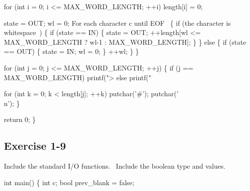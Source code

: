     for (int i = 0; i <= MAX_WORD_LENGTH; ++i)
        length[i] = 0;

    state = OUT;
    wl = 0;
    \LA{}For each character \code{}c\edoc{} until \code{}EOF\edoc{}~{\nwtagstyle{}}\RA{} \{
        if (\LA{}the character is whitespace~{\nwtagstyle{}}\RA{}) \{
            if (state == IN) \{
                state = OUT;
                ++length[wl <= MAX_WORD_LENGTH ? wl-1 : MAX_WORD_LENGTH];
            \}
        \} else \{
            if (state == OUT) \{
                state = IN;
                wl = 0;
            \}
            ++wl;
        \}
    \}

    for (int j = 0; j <= MAX_WORD_LENGTH; ++j) \{
        if (j == MAX_WORD_LENGTH)
            printf(">%
        else
            printf(" %

        for (int k = 0; k < length[j]; ++k)
            putchar('#');
        putchar('\\n');
    \}


    return 0;
\}
\nwendcode{}\nwdocspar
\nwenddocs{}\subsection{Exercise 1-9}

\nwenddocs{}\endmoddef{}
\LA{}Include the standard I/O functions.~{\nwtagstyle{}}\RA{}
\LA{}Include the boolean type and values.~{\nwtagstyle{}}\RA{}
\nwendcode{}\nwdocspar


\nwenddocs{}\plusendmoddef
int main()
\{
    int c;
    bool prev_blank = false;

